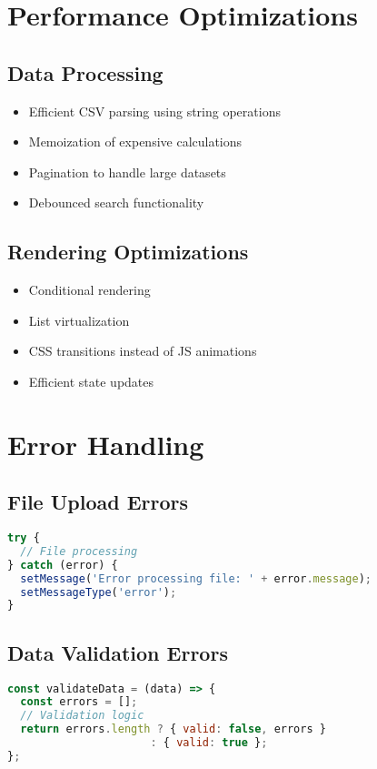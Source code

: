 \documentclass[12pt,a4paper]{article}
\begin{document}
\section{Performance Optimizations}

\subsection{Data Processing}
\begin{itemize}
    \item Efficient CSV parsing using string operations
    \item Memoization of expensive calculations
    \item Pagination to handle large datasets
    \item Debounced search functionality
\end{itemize}

\subsection{Rendering Optimizations}
\begin{itemize}
    \item Conditional rendering
    \item List virtualization
    \item CSS transitions instead of JS animations
    \item Efficient state updates
\end{itemize}

\section{Error Handling}

\subsection{File Upload Errors}
\begin{lstlisting}[language=JavaScript]
try {
  // File processing
} catch (error) {
  setMessage('Error processing file: ' + error.message);
  setMessageType('error');
}
\end{lstlisting}

\subsection{Data Validation Errors}
\begin{lstlisting}[language=JavaScript]
const validateData = (data) => {
  const errors = [];
  // Validation logic
  return errors.length ? { valid: false, errors } 
                      : { valid: true };
};
\end{lstlisting}
\end{document}
